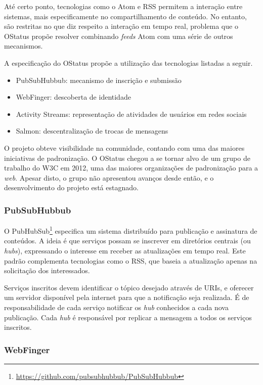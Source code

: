 Até certo ponto, tecnologias como o Atom e RSS permitem a interação entre sistemas,
mais especificamente no compartilhamento de conteúdo. No entanto, são restritas no
que diz respeito a interação em tempo real, problema que o OStatus propõe resolver
combinando \textit{feeds} Atom com uma série de outros mecanismos.

A especificação do OStatus propõe a utilização das tecnologias listadas a seguir.

\begin{itemize}
  \item{PubSubHubbub: mecanismo de inscrição e submissão}
  \item{WebFinger: descoberta de identidade}
  \item{Activity Streams: representação de atividades de usuários em redes sociais}
  \item{Salmon: descentralização de trocas de mensagens}
\end{itemize}

O projeto obteve visibilidade na comunidade, contando com uma das maiores
iniciativas de padronização. O OStatus chegou a se tornar alvo de um grupo de
trabalho do W3C em 2012, uma das maiores organizações de padronização para a
\textit{web}. Apesar disto, o grupo não apresentou avanços desde então, e o
desenvolvimento do projeto está estagnado.

\subsubsection{PubSubHubbub}

O PubHubSub\footnote{\url{https://github.com/pubsubhubbub/PubSubHubbub}} especifica
um sistema distribuído para publicação e assinatura de conteúdos. A ideia é que
serviços possam se inscrever em diretórios centrais (ou \textit{hubs}), expressando
o interesse em receber as atualizações em tempo real. Este padrão complementa
tecnologias como o RSS, que baseia a atualização apenas na solicitação dos
interessados.

Serviços inscritos devem identificar o tópico desejado através de URIs, e oferecer
um servidor disponível pela internet para que a notificação seja realizada. É de
responsabilidade de cada serviço notificar os \textit{hub} conhecidos a cada nova
publicação. Cada \textit{hub} é responsável por replicar a mensagem a todos os
serviços inscritos.

\subsubsection{WebFinger}

